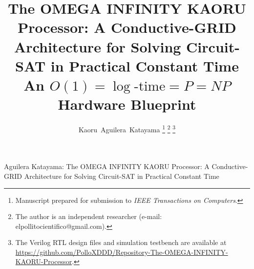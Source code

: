 \documentclass[letterpaper,journal]{IEEEtran}
\begin{document}
\title{The OMEGA INFINITY KAORU Processor: A Conductive-GRID
Architecture for Solving Circuit-SAT in Practical Constant Time\\
\large An $O(1)=\log\text{-time}=P=NP$ Hardware Blueprint}

\author{Kaoru~Aguilera~Katayama%
\thanks{Manuscript prepared for submission to \emph{IEEE Transactions on Computers}.}
\thanks{The author is an independent researcher (e-mail: elpollitocientifico@gmail.com).}
\thanks{The Verilog RTL design files and simulation testbench are available at \url{https://github.com/PolloXDDD/Repository-The-OMEGA-INFINITY-KAORU-Processor}.}}
{Aguilera Katayama: The OMEGA INFINITY KAORU Processor: A Conductive-GRID Architecture for Solving Circuit-SAT in Practical Constant Time}

\maketitle
\end{document}
